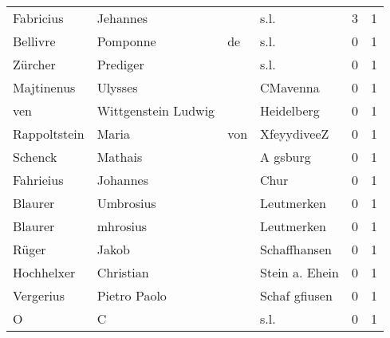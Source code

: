 \begin{tabular}{llllrr}
                Fabricius &                           Jehannes &             &                                        s.l. &          3 &         1 \\
                 Bellivre &                           Pomponne &          de &                                        s.l. &          0 &         1 \\
                  Zürcher &                           Prediger &             &                                        s.l. &          0 &         1 \\
               Majtinenus &                            Ulysses &             &                                    CMavenna &          0 &         1 \\
                      ven &                Wittgenstein Ludwig &             &                                  Heidelberg &          0 &         1 \\
             Rappoltstein &                              Maria &         von &                                 XfeyydiveeZ &          0 &         1 \\
                  Schenck &                            Mathais &             &                                    A gsburg &          0 &         1 \\
                Fahrieius &                           Johannes &             &                                        Chur &          0 &         1 \\
                  Blaurer &                          Umbrosius &             &                                  Leutmerken &          0 &         1 \\
                  Blaurer &                           mhrosius &             &                                  Leutmerken &          0 &         1 \\
                    Rüger &                              Jakob &             &                                Schaffhansen &          0 &         1 \\
               Hochhelxer &                          Christian &             &                              Stein a. Ehein &          0 &         1 \\
                Vergerius &                       Pietro Paolo &             &                               Schaf gfiusen &          0 &         1 \\
                        O &                                  C &             &                                        s.l. &          0 &         1 \\

\end{tabular}
